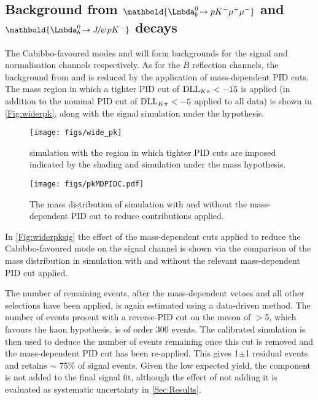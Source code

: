 




\FloatBarrier
\subsection[Background from $\LbK$ and $\LbKjpsi$ decays]{Background from $\mathbold{\LbK}$ and $\mathbold{\LbKjpsi}$ decays}\label{subsec:LbK}

The Cabibbo-favoured modes \LbK and \LbKjpsi will form backgrounds for the signal and normalisation channels respectively. As for the $B$ reflection channels, the background from \LbK and \LbKjpsi is reduced by the application of mass-dependent PID cuts. The mass region in which a tighter PID cut of $\mathrm{DLL}_{{K}{\pi}}<-15$ is applied (in addition to the nominal PID cut of $\mathrm{DLL}_{{K}{\pi}}<-5$ applied to all data) is shown in \autoref{Fig:widerpk}, along with the signal simulation under the \LbK hypothesis. 

\begin{figure}[!h]\def\nh{0.3\textwidth}
  \centering
  \texttt{[image: figs/wide\_pk]}
  \caption{\LbK simulation with the region in which tighter PID cuts are imposed indicated by the shading and \Lbpi simulation under the \LbK mass hypothesis.}
  \label{Fig:widerpk}
\end{figure}
\begin{figure}[!h]\def\nh{0.3\textwidth}
  \centering
  \texttt{[image: figs/pkMDPIDC.pdf]}
  \caption{The mass distribution of \Lbpi simulation with and without the mass-dependent PID cut to reduce \LbK contributions applied.}
  \label{Fig:widerpksig}
\end{figure}
In \autoref{Fig:widerpksig} the effect of the mass-dependent cuts applied to reduce the Cabibbo-favoured mode \LbK on the signal channel is shown via the comparison of the \Lbpi mass distribution in simulation with and without the relevant mass-dependent PID cut applied.

The number of remaining \LbK events, after the mass-dependent vetoes and all other selections have been applied, is again estimated using a data-driven method. The number of \LbK events present with a reverse-PID cut on the meson of \dllkpi$>$5, which favours the kaon hypothesis, is of order 300 events. The calibrated simulation is then used to deduce the number of \LbK events remaining once this cut is removed and the mass-dependent PID cut has been re-applied. This gives 1$\pm$1 residual \LbK events and retains $\sim$ 75\% of signal events. Given the low expected \LbK yield, the \LbK component is not added to the final signal fit, although the effect of not adding it is evaluated as systematic uncertainty in \autoref{Sec:Results}.%


